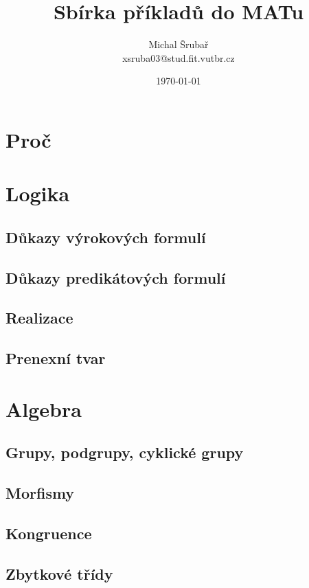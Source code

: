\documentclass[12pt,a4paper,notitlepage,final]{article}
\author{Michal Šrubař\\xsruba03@stud.fit.vutbr.cz}
\date{\today}
\title{Sbírka příkladů do MATu}
\begin{document}
\maketitle

\section{Proč} \label{proc}

\section{Logika} \label{logika}
\subsection{Důkazy výrokových formulí}        
\subsection{Důkazy predikátových formulí}     
\subsection{Realizace}                        
\subsection{Prenexní tvar}                    
\section{Algebra}
\subsection{Grupy, podgrupy, cyklické grupy}  
\subsection{Morfismy}                         
\subsection{Kongruence}                       
\subsection{Zbytkové třídy}                   
\end{document}
